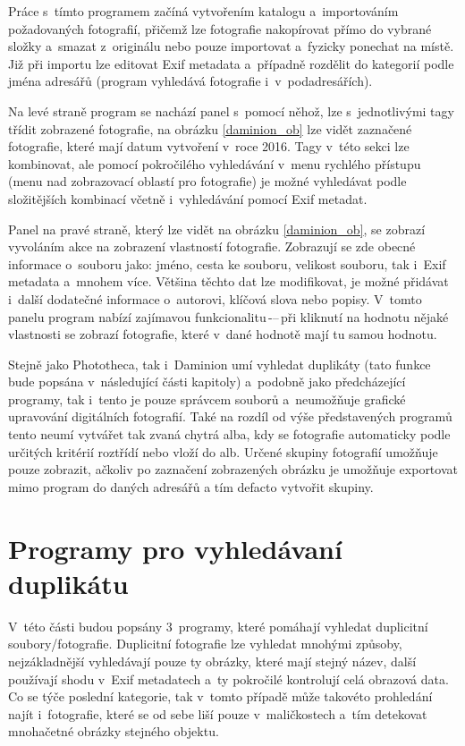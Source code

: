 Práce s~tímto programem začíná vytvořením katalogu a~importováním požadovaných fotografií, přičemž lze fotografie nakopírovat přímo do vybrané složky a~smazat z~originálu nebo pouze importovat a~fyzicky ponechat na místě. Již při importu lze editovat Exif metadata a~případně rozdělit do kategorií podle jména adresářů (program vyhledává fotografie i~v~podadresářích).

Na levé straně program se nachází panel s~pomocí něhož, lze s~jednotlivými tagy  třídit zobrazené fotografie, na obrázku \ref{daminion_ob} lze vidět zaznačené fotografie, které mají datum vytvoření v~roce 2016. Tagy v~této sekci lze kombinovat, ale pomocí pokročilého vyhledávání v~menu rychlého přístupu (menu nad zobrazovací oblastí pro fotografie) je možné vyhledávat podle složitějších kombinací včetně i~vyhledávání pomocí Exif metadat.

Panel na pravé straně, který lze vidět na obrázku \ref{daminion_ob}, se zobrazí vyvoláním akce na zobrazení vlastností fotografie. Zobrazují se zde obecné informace o~souboru jako: jméno, cesta ke souboru, velikost souboru, tak i~Exif metadata a~mnohem více. Většina těchto dat lze modifikovat, je možné přidávat i~další dodatečné informace o~autorovi, klíčová slova nebo popisy. V~tomto panelu program nabízí zajímavou funkcionalitu\,-–\,při kliknutí na hodnotu nějaké vlastnosti se zobrazí fotografie, které v~dané hodnotě mají tu samou hodnotu.

Stejně jako Phototheca, tak i~Daminion umí vyhledat duplikáty (tato funkce bude popsána v~následující části kapitoly) a~podobně jako předcházející programy, tak i~tento je pouze správcem souborů a~neumožňuje grafické upravování digitálních fotografií. Také na rozdíl od výše představených programů tento neumí vytvářet tak zvaná chytrá alba, kdy se fotografie automaticky podle určitých kritérií roztřídí nebo vloží do alb. Určené skupiny fotografií umožňuje pouze zobrazit, ačkoliv po zaznačení zobrazených obrázku je umožňuje exportovat mimo program do daných adresářů a tím defacto vytvořit skupiny.

\section{Programy pro vyhledávaní duplikátu}
V~této části budou popsány 3~programy, které pomáhají vyhledat duplicitní soubory/fotografie. Duplicitní fotografie lze vyhledat mnohými způsoby, nejzákladnější vyhledávají pouze ty obrázky, které mají stejný název, další používají shodu v~Exif metadatech a~ty pokročilé kontrolují celá obrazová data. Co se týče poslední kategorie, tak v~tomto případě může takovéto prohledání najít i~fotografie, které se od sebe liší pouze v~maličkostech a~tím detekovat mnohačetné obrázky stejného objektu.

